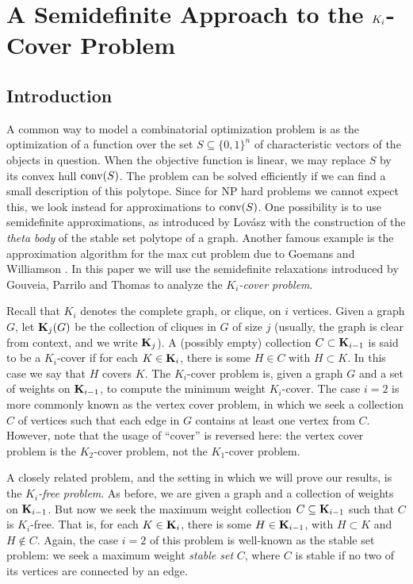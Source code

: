 \chapter{A Semidefinite Approach to the $K_\MakeLowercase{i}$-Cover Problem}
\label{chap:kicover}

\section{Introduction}
A common way to model a combinatorial optimization problem is as the optimization of a function over the set $S \subseteq \{0,1\}^n$ of  characteristic vectors of the objects in question. When the objective function is linear, 
we may replace $S$ by its convex hull $\hbox{conv}(S)$. The problem can be solved efficiently if we can find a small description of this polytope. Since for NP hard problems we cannot expect this, we look instead for  approximations to $\hbox{conv}(S)$. One possibility is to use semidefinite approximations, as introduced by Lov\'{a}sz \cite{lovasz} with the construction of the {\em theta body} of the stable set polytope of a graph. Another famous example is the approximation algorithm for the max cut problem due to Goemans and Williamson \cite{goemans_williamson}. In this paper we will use the semidefinite relaxations introduced by Gouveia, Parrilo and Thomas \cite{gpt} to analyze the {\em $K_i$-cover problem}.

Recall that $K_i$ denotes the complete graph, or clique, on $i$ vertices. Given a graph $G$, let $\mathbf{K}_j(G)$ be the collection of cliques in $G$ of size $j$ (usually, the graph is clear from context, and we write $\mathbf{K}_j$). A (possibly empty) collection $C \subset \mathbf{K}_{i-1}$ is said to be a $K_i$-cover if for each $K \in \mathbf{K}_i$, there is some $H \in C$ with $H \subset K$. In this case we say that $H$ covers $K$. The $K_i$-cover problem is, given a graph $G$ and a set of weights on $\mathbf{K}_{i-1}$, to compute the minimum weight $K_i$-cover. The case $i=2$ is more commonly known as the vertex cover problem, in which we seek a collection $C$ of vertices such that each edge in $G$ contains at least one vertex from $C$. However, note that the usage of ``cover'' is reversed here: the vertex cover problem is the $K_2$-cover problem, not the $K_1$-cover problem.

A closely related problem, and the setting in which we will prove our results, is the {\em $K_i$-free problem}. As before, we are given a graph and a collection of weights on $\mathbf{K}_{i-1}$. But now we seek the maximum weight collection $C \subseteq \mathbf{K}_{i-1}$ such that $C$ is $K_i$-free. That is, for each $K \in \mathbf{K}_i$, there is some $H \in \mathbf{K}_{i-1}$, with $H \subset K$ and $H \notin C$. Again, the case $i=2$ of this problem is well-known as the stable set problem: we seek a maximum weight {\em stable set} $C$, where $C$ is stable if no two of its vertices are connected by an edge.

